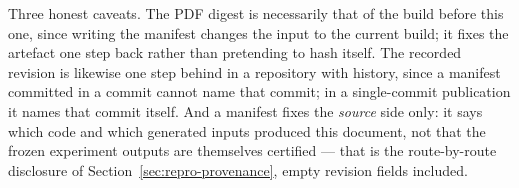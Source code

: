 Three honest caveats. The PDF digest is necessarily that of the build before
this one, since writing the manifest changes the input to the current build;
it fixes the artefact one step back rather than pretending to hash itself. The
recorded revision is likewise one step behind in a repository with history,
since a manifest committed in a commit cannot name that commit; in a
single-commit publication it names that commit itself. And
a manifest fixes the \emph{source} side only: it says which code and which
generated inputs produced this document, not that the frozen experiment
outputs are themselves certified --- that is the route-by-route disclosure of
Section~\ref{sec:repro-provenance}, empty revision fields included.

\setlength{\emergencystretch}{0pt}
